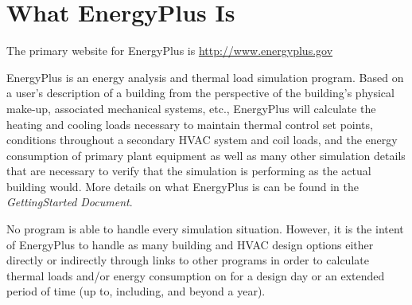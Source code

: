 \section{What EnergyPlus Is}\label{what-energyplus-is}

The primary website for EnergyPlus is \url{http://www.energyplus.gov}

EnergyPlus is an energy analysis and thermal load simulation program. Based on a user's description of a building from the perspective of the building's physical make-up, associated mechanical systems, etc., EnergyPlus will calculate the heating and cooling loads necessary to maintain thermal control set points, conditions throughout a secondary HVAC system and coil loads, and the energy consumption of primary plant equipment as well as many other simulation details that are necessary to verify that the simulation is performing as the actual building would. More details on what EnergyPlus is can be found in the \emph{GettingStarted Document}.

No program is able to handle every simulation situation. However, it is the intent of EnergyPlus to handle as many building and HVAC design options either directly or indirectly through links to other programs in order to calculate thermal loads and/or energy consumption on for a design day or an extended period of time (up to, including, and beyond a year).

